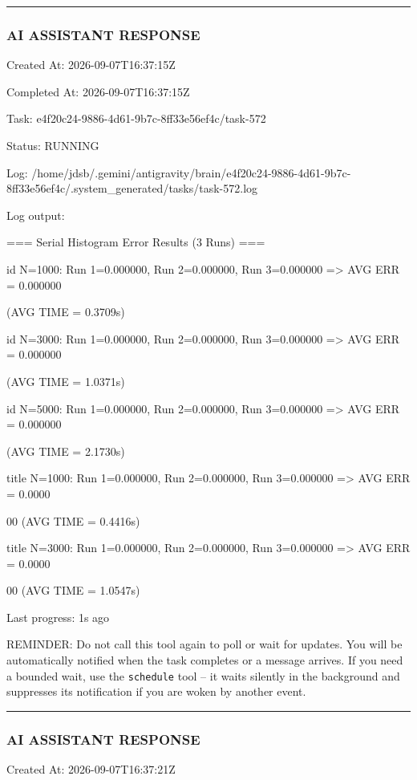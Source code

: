 \documentclass[11pt,a4paper]{article}
\begin{document}
\hrule

\subsubsection{AI ASSISTANT RESPONSE}

Created At: 2026-09-07T16:37:15Z

Completed At: 2026-09-07T16:37:15Z

Task: e4f20c24-9886-4d61-9b7c-8ff33e56ef4c/task-572

Status: RUNNING

Log: /home/jdsb/.gemini/antigravity/brain/e4f20c24-9886-4d61-9b7c-8ff33e56ef4c/.system\_generated/tasks/task-572.log

Log output:

=== Serial Histogram Error Results (3 Runs) ===

id N=1000: Run 1=0.000000, Run 2=0.000000, Run 3=0.000000 => AVG ERR = 0.000000

(AVG TIME = 0.3709s)

id N=3000: Run 1=0.000000, Run 2=0.000000, Run 3=0.000000 => AVG ERR = 0.000000

(AVG TIME = 1.0371s)

id N=5000: Run 1=0.000000, Run 2=0.000000, Run 3=0.000000 => AVG ERR = 0.000000

(AVG TIME = 2.1730s)

title N=1000: Run 1=0.000000, Run 2=0.000000, Run 3=0.000000 => AVG ERR = 0.0000

00 (AVG TIME = 0.4416s)

title N=3000: Run 1=0.000000, Run 2=0.000000, Run 3=0.000000 => AVG ERR = 0.0000

00 (AVG TIME = 1.0547s)


Last progress: 1s ago



REMINDER: Do not call this tool again to poll or wait for updates. You will be automatically notified when the task completes or a message arrives. If you need a bounded wait, use the \texttt{schedule} tool -- it waits silently in the background and suppresses its notification if you are woken by another event.


\hrule

\subsubsection{AI ASSISTANT RESPONSE}

Created At: 2026-09-07T16:37:21Z
\end{document}
